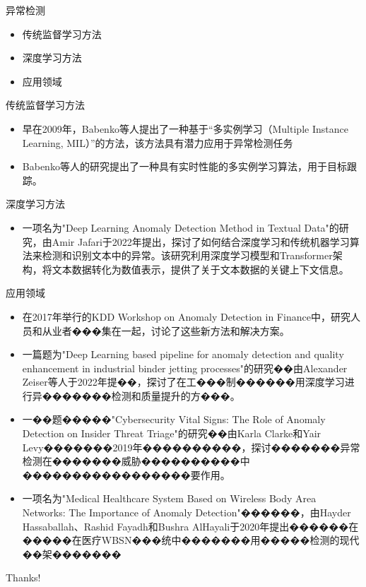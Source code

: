 \documentclass[UTF8,AutoFakeBold,AutoFakeSlant]{beamer}
\begin{document}
\begin{frame}{异常检测}
    \begin{itemize}
        \item 传统监督学习方法
        \item 深度学习方法
        \item 应用领域
    \end{itemize}
\end{frame}

\begin{frame}{传统监督学习方法}
    \begin{itemize}
        \item 早在2009年，Babenko等人提出了一种基于“多实例学习（Multiple Instance Learning, MIL）”的方法，该方法具有潜力应用于异常检测任务
        \item Babenko等人的研究提出了一种具有实时性能的多实例学习算法，用于目标跟踪。
    \end{itemize}
\end{frame}

\begin{frame}{深度学习方法}
    \begin{itemize}
        \item 一项名为"Deep Learning Anomaly Detection Method in Textual Data"的研究，由Amir Jafari于2022年提出，探讨了如何结合深度学习和传统机器学习算法来检测和识别文本中的异常。该研究利用深度学习模型和Transformer架构，将文本数据转化为数值表示，提供了关于文本数据的关键上下文信息。
    \end{itemize}
\end{frame}

\begin{frame}{应用领域}
    \scriptsize
    \begin{itemize}
        \item 在2017年举行的KDD Workshop on Anomaly Detection in Finance中，研究人员和从业者���集在一起，讨论了这些新方法和解决方案。
        \item 一篇题为"Deep Learning based pipeline for anomaly detection and quality enhancement in industrial binder jetting processes"的研究��由Alexander Zeiser等人于2022年提��，探讨了在工���制������用深度学习进行异�������检测和质量提升的方���。
        \item 一��题�����"Cybersecurity Vital Signs: The Role of Anomaly Detection on Insider Threat Triage"的研究��由Karla Clarke和Yair Levy�������2019年����������，探讨�������异常检测在�������威胁����������中�����������������要作用。
        \item 一项名为"Medical Healthcare System Based on Wireless Body Area Networks: The Importance of Anomaly Detection"������，由Hayder Hassaballah、Rashid Fayadh和Bushra AlHayali于2020年提出������在�����在医疗WBSN���统中�������用�����检测的现代��架�������
    \end{itemize}
\end{frame}

\begin{frame}
    \begin{center}
        {\Huge\calligra Thanks!}
    \end{center}
\end{frame}
\end{document}
